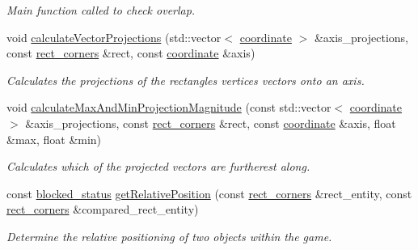 \begin{DoxyCompactItemize}
\begin{DoxyCompactList}\small\item\em Main function called to check overlap. \end{DoxyCompactList}\item 
void \hyperlink{classGeometryEngine_aad070884eb5c9380cd3d75a22e95ba8a}{calculate\-Vector\-Projections} (std\-::vector$<$ \hyperlink{structcoordinate}{coordinate} $>$ \&axis\-\_\-projections, const \hyperlink{structrect__corners}{rect\-\_\-corners} \&rect, const \hyperlink{structcoordinate}{coordinate} \&axis)
\begin{DoxyCompactList}\small\item\em Calculates the projections of the rectangles vertices vectors onto an axis. \end{DoxyCompactList}\item 
void \hyperlink{classGeometryEngine_ad5c9132e2ddc165f92ac81c021e21622}{calculate\-Max\-And\-Min\-Projection\-Magnitude} (const std\-::vector$<$ \hyperlink{structcoordinate}{coordinate} $>$ \&axis\-\_\-projections, const \hyperlink{structrect__corners}{rect\-\_\-corners} \&rect, const \hyperlink{structcoordinate}{coordinate} \&axis, float \&max, float \&min)
\begin{DoxyCompactList}\small\item\em Calculates which of the projected vectors are furtherest along. \end{DoxyCompactList}\item 
const \hyperlink{Structures_8h_a6fef29d9424addfa69bdd2a379424896}{blocked\-\_\-status} \hyperlink{classGeometryEngine_a662ec9af09fd513700f41d3e7090b1bf}{get\-Relative\-Position} (const \hyperlink{structrect__corners}{rect\-\_\-corners} \&rect\-\_\-entity, const \hyperlink{structrect__corners}{rect\-\_\-corners} \&compared\-\_\-rect\-\_\-entity)
\begin{DoxyCompactList}\small\item\em Determine the relative positioning of two objects within the game. \end{DoxyCompactList}\end{DoxyCompactItemize}

